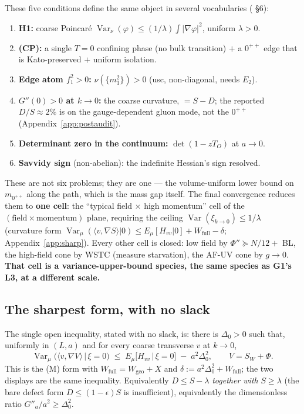 These five conditions define the same object in several vocabularies
( \S6):

\begin{enumerate}
\item \textbf{H1:} coarse Poincar\'e $\operatorname{Var}_\nu(\varphi)\le(1/\lambda)\int|\nabla
  \varphi|^2$, uniform $\lambda>0$.
\item \textbf{(CP):} a single $T=0$ confining phase (no bulk transition) $+$ a $0^{++}$ edge that
  is Kato-preserved $+$ uniform isolation.
\item \textbf{Edge atom $f_1^2>0$:} $\nu(\{m_1^2\})>0$ (usc, non-diagonal, needs $E_2$).
\item \textbf{$G''(0)>0$ at $k\to0$:} the coarse curvature, $=S-D$; the reported $D/S\approx2\%$
  is on the gauge-dependent gluon mode, not the $0^{++}$ (Appendix~\ref{app:postaudit}).
\item \textbf{Determinant zero in the continuum:} $\det(1-zT_O)$ at $a\to0$.
\item \textbf{Savvidy sign} (non-abelian): the indefinite Hessian's sign resolved.
\end{enumerate}

These are not six problems; they are one --- the volume-uniform lower bound on $m_{0^{++}}$ along
the path, which is the mass gap itself. The final convergence reduces them to \textbf{one cell}:
the ``typical field $\times$ high momentum'' cell of the $(\text{field}\times\text{momentum})$
plane, requiring the ceiling $\operatorname{Var}(\xi_{k\to0})\le1/\lambda$ (curvature form
$\operatorname{Var}_\mu(\langle v,\nabla S\rangle|0)\le E_\mu[H_{vv}|0]+W_{\mathrm{full}}-\delta$;
Appendix~\ref{app:sharp}). Every other cell is closed: low field by $\Phi''\succeq N/12+$ BL, the
high-field cone by WSTC (measure starvation), the AF-UV cone by $g\to0$. \textbf{That cell is a
variance-upper-bound species, the same species as G1's L3, at a different scale.}

\subsection{The sharpest form, with no slack}

The single open inequality, stated with no slack, is: there is $\Delta_0>0$ such that, uniformly
in $(L,a)$ and for every coarse transverse $v$ at $k\to0$,
\begin{equation}
\operatorname{Var}_\mu\!\big(\langle v,\nabla V\rangle\,\big|\,\xi=0\big)
\;\le\;
E_\mu\!\big[H_{vv}\,\big|\,\xi=0\big]\;-\;a^{2}\Delta_0^{2},
\qquad V=S_W+\Phi .
\label{eq:sharpest}
\end{equation}
This is the (M) form with $W_{\mathrm{full}}=W_{\mathrm{geo}}+X$ and
$\delta:=a^{2}\Delta_0^{2}+W_{\mathrm{full}}$; the two displays are the same inequality.
Equivalently $D\le S-\lambda$ \emph{together with} $S\ge\lambda$ (the bare defect form
$D\le(1-\epsilon)S$ is insufficient), equivalently the dimensionless ratio
$G''_a/a^{2}\ge\Delta_0^{2}$.

